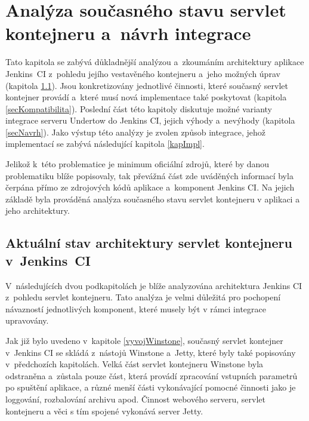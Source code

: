 \chapter{Analýza současného stavu servlet kontejneru a~návrh integrace}
    Tato kapitola se zabývá důkladnější analýzou a~zkoumáním architektury aplikace Jenkins~CI
    z~pohledu jejího vestavěného kontejneru a~jeho možných úprav (kapitola \ref{secArchitecture}). 
    Jsou konkretizovány jednotlivé činnosti, které současný servlet kontejner provádí
    a~které musí nová implementace také poskytovat (kapitola \ref{secKompatibilita}).
    Poslední část této kapitoly diskutuje možné varianty integrace serveru Undertow do Jenkins CI,
    jejich výhody a~nevýhody (kapitola \ref{secNavrh}). Jako výstup této analýzy je zvolen způsob integrace, jehož
    implementací se zabývá následující kapitola \ref{kapImpl}.

    Jelikož k~této problematice je minimum oficiální zdrojů, které by danou problematiku blíže popisovaly, 
    tak převážná část zde uváděných informací byla čerpána přímo ze zdrojových kódů aplikace a~komponent Jenkins CI.
    Na jejich základě byla prováděná analýza současného stavu servlet kontejneru v aplikaci a jeho architektury.
    
    \section{Aktuální stav architektury servlet kontejneru v~Jenkins~CI}\label{secArchitecture}
        V~následujících dvou podkapitolách je blíže analyzována architektura
        Jenkins CI z~pohledu servlet kontejneru. Tato analýza je velmi důležitá
        pro pochopení návazností jednotlivých komponent, které musely být v rámci integrace upravovány.

        Jak již bylo uvedeno v~kapitole \ref{vyvojWinstone}, současný servlet kontejner 
        v~Jenkins CI se skládá z~nástojů Winstone a~Jetty, které byly také popisovány
        v~předchozích kapitolách. Velká část servlet
        kontejneru Winstone byla odstraněna a~zůstala pouze část, která
        provádí zpracování vstupních parametrů po spuštění aplikace, a různé menší části
        vykonávající pomocné činnosti jako je loggování, rozbalování archivu apod. Činnost webového serveru, servlet kontejneru
        a věci s tím spojené vykonává server Jetty.
        

